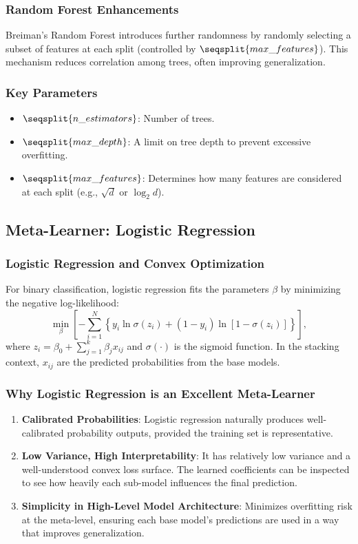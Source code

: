\documentclass[12pt]{article}
\begin{document}
\subsubsection{Random Forest Enhancements}
Breiman’s Random Forest introduces further randomness by randomly selecting a subset of features at each split (controlled by \(\seqsplit{max\_features}\)). This mechanism reduces correlation among trees, often improving generalization.

\subsubsection{Key Parameters}
\begin{itemize}[noitemsep]
    \item \(\seqsplit{n\_estimators}\): Number of trees.
    \item \(\seqsplit{max\_depth}\): A limit on tree depth to prevent excessive overfitting.
    \item \(\seqsplit{max\_features}\): Determines how many features are considered at each split (e.g., \(\sqrt{d}\) or \(\log_2 d\)).
\end{itemize}

\subsection{Meta-Learner: Logistic Regression}

\subsubsection{Logistic Regression and Convex Optimization}
For binary classification, logistic regression fits the parameters \(\beta\) by minimizing the negative log-likelihood:
\[
\min_{\beta} \left[ -\sum_{i=1}^N \left\{ y_i \ln \sigma(z_i) + (1 - y_i)\ln [1 - \sigma(z_i)] \right\} \right],
\]
where \(z_i = \beta_0 + \sum_{j=1}^k \beta_j x_{ij}\) and \(\sigma(\cdot)\) is the sigmoid function. In the stacking context, \(x_{ij}\) are the predicted probabilities from the base models.

\subsubsection{Why Logistic Regression is an Excellent Meta-Learner}
\begin{enumerate}[label=\arabic*)]
    \item \textbf{Calibrated Probabilities}: Logistic regression naturally produces well-calibrated probability outputs, provided the training set is representative.
    \item \textbf{Low Variance, High Interpretability}: It has relatively low variance and a well-understood convex loss surface. The learned coefficients can be inspected to see how heavily each sub-model influences the final prediction.
    \item \textbf{Simplicity in High-Level Model Architecture}: Minimizes overfitting risk at the meta-level, ensuring each base model’s predictions are used in a way that improves generalization.
\end{enumerate}
\end{document}
